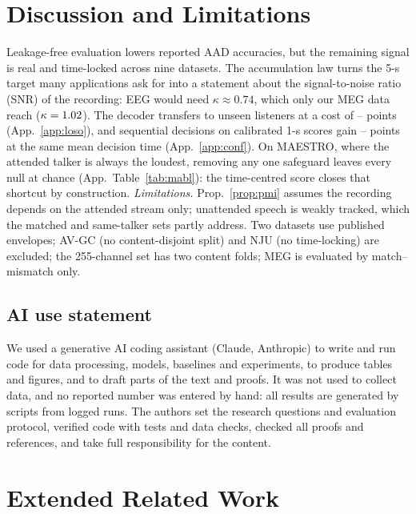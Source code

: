 \documentclass[10pt,twocolumn,letterpaper]{article}
\begin{document}
\section{Discussion and Limitations}
Leakage-free evaluation lowers reported AAD accuracies, but the remaining signal is real and
time-locked across nine datasets. The accumulation law turns the 5-s target many applications ask for into a statement about the
signal-to-noise ratio (SNR) of the recording: EEG would need $\kappa\approx0.74$, which only our MEG data reach ($\kappa=1.02$).  The decoder transfers to unseen listeners at a cost of
\losoDropMin--\losoDropMax{} points (App.~\ref{app:loso}), and sequential decisions on
calibrated 1-s scores gain \confGainTwoMin--\confGainTwoMax{} points at the same mean
decision time (App.~\ref{app:conf}). On MAESTRO, where the attended talker is always the
loudest, removing any one safeguard leaves every null at chance (App.~Table~\ref{tab:mabl}): the
time-centred score closes that shortcut by construction.
\emph{Limitations.}
Prop.~\ref{prop:pmi} assumes the recording depends on the attended stream only;
unattended speech is weakly tracked, which the matched and same-talker sets partly
address. Two datasets use published envelopes; AV-GC (no content-disjoint split) and NJU (no
time-locking) are excluded; the 255-channel set has two content folds; MEG is evaluated by
match--mismatch only.

\subsection*{AI use statement}
We used a generative AI coding assistant (Claude, Anthropic) to write and run code for data
processing, models, baselines and experiments, to produce tables and figures, and to draft
parts of the text and proofs. It was not used to collect data, and no reported number was
entered by hand: all results are generated by scripts from logged runs. The authors set the
research questions and evaluation protocol, verified code with tests and data checks,
checked all proofs and references, and take full responsibility for the content.




\clearpage
\appendix
\onecolumn
\section{Extended Related Work}\label{app:related}
\end{document}
